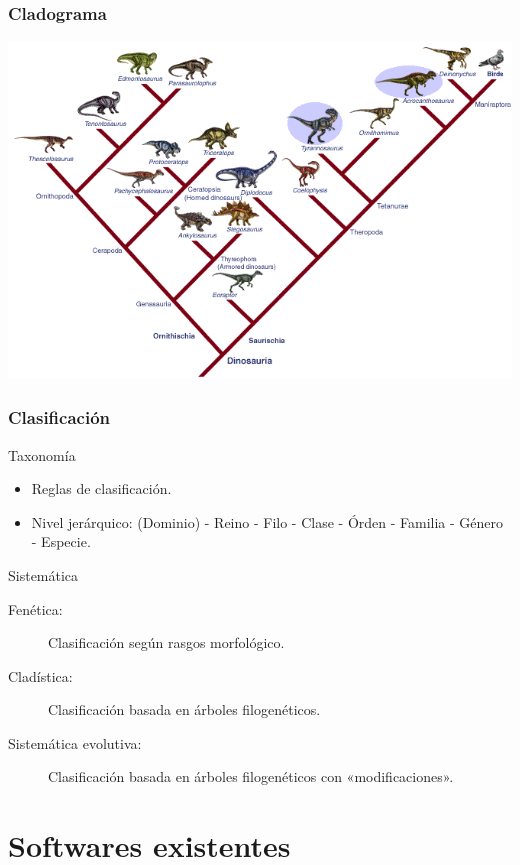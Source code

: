 \documentclass[green, compress]{beamer}
\begin{document}
\begin{frame}
\frametitle{Cladograma}
\begin{center}
\includegraphics[scale=.4]{cladogramDino.png}
\end{center}
\end{frame}

\begin{frame}
\frametitle{Clasificación}
\begin{block}{Taxonomía}
\begin{itemize}
\item Reglas de clasificación.
\item Nivel jerárquico: (Dominio) - Reino - Filo - Clase - Órden -
  Familia - Género - Especie.
\end{itemize}
\end{block}

\begin{block}{Sistemática}
\begin{description}
\item[Fenética:] Clasificación según rasgos morfológico.
\item[Cladística:] Clasificación basada en árboles filogenéticos.
\item[Sistemática evolutiva:] Clasificación basada en árboles
  filogenéticos con «modificaciones».
\end{description}
\end{block}
\end{frame}

\section{Softwares existentes}
\end{document}

